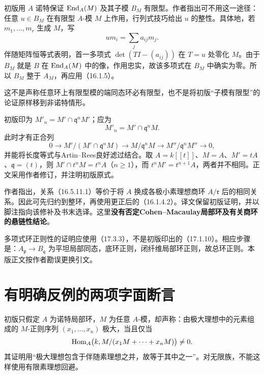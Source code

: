 初版用 $A$ 诺特保证 $\operatorname{End}_A(M)$ 及其子模 $B_M$ 有限型。作者指出可不用这一途径：任意 $u\in B_M$ 在有限型 $A$-模 $M$ 上作用，行列式技巧给出 $u$ 的整性。具体地，若 $m_1,\ldots,m_r$ 生成 $M$，写
\[
 um_i=\sum_j a_{ij}m_j.
\]
伴随矩阵恒等式表明，首一多项式 $\det(TI-(a_{ij}))$ 在 $T=u$ 处零化 $M$。由于 $B_M$ 就是 $B$ 在 $\operatorname{End}_A(M)$ 中的像，作用忠实，故该多项式在 $B_M$ 中确实为零。所以 $B_M$ 整于 $A_M$，再应用（16.1.5）。

这不是声称任意环上有限型模的端同态环必有限型，也不是将初版“子模有限型”的论证原样移到非诺特情形。

初版印为 $M'_n=M'\cap\mathfrak q^nM'$；应为
\[
 \boxed{M'_n=M'\cap\mathfrak q^nM.}
\]
此时才有正合列
\[
 0\longrightarrow M'/(M'\cap\mathfrak q^nM)
 \longrightarrow M/\mathfrak q^nM
 \longrightarrow M''/\mathfrak q^nM''\longrightarrow0,
\]
并能将长度等式与Artin--Rees良好滤过结合。取 $A=k[[t]]$、$M=A$、$M'=tA$、$\mathfrak q=(t)$，则 $M'\cap t^nM=t^nA$（$n\geq1$），而 $t^nM'=t^{n+1}A$，两者并不相同。正文采用作者修订，并注明初版原式。

作者指出，关系（16.5.11.1）等价于将 $A$ 换成各极小素理想商环 $A/\mathfrak r$ 后的相同关系。因此可先归约到整环，再使用更正后的（16.1.4.2）。译文保留初版证明，并以脚注指向该修补及书末选译。这里\textbf{没有否定Cohen--Macaulay局部环及有关商环的悬链性结论}。

多项式环正则性的证明应使用（17.3.3），不是初版印出的（17.1.10）。相应步骤是：$A_{\mathfrak p}\to B_{\mathfrak q}$ 为平坦局部同态，底环正则，闭纤维局部环正则，故总环正则。本版正文按作者勘误更换引文。

\section{有明确反例的两项字面断言}
初版只假定 $A$ 为诺特局部环，$M$ 为任意 $A$-模，却声称：由极大理想中的元素组成的 $M$-正则序列 $(x_1,\ldots,x_n)$ 极大，当且仅当
\[
 \operatorname{Hom}_A\bigl(k,M/(x_1M+\cdots+x_nM)\bigr)\ne0.
\]
其证明用“极大理想包含于伴随素理想之并，故等于其中之一”。对无限族，不能这样使用有限素理想回避。

